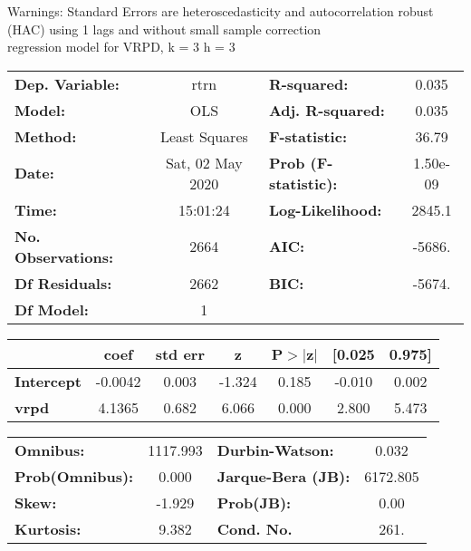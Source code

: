 Warnings: \newline
 [1] Standard Errors are heteroscedasticity and autocorrelation robust (HAC) using 1 lags and without small sample correction\\ 

regression model for VRPD, k = 3 h = 3\begin{center}
\begin{tabular}{lclc}
\toprule
\textbf{Dep. Variable:}    &       rtrn       & \textbf{  R-squared:         } &     0.035   \\
\textbf{Model:}            &       OLS        & \textbf{  Adj. R-squared:    } &     0.035   \\
\textbf{Method:}           &  Least Squares   & \textbf{  F-statistic:       } &     36.79   \\
\textbf{Date:}             & Sat, 02 May 2020 & \textbf{  Prob (F-statistic):} &  1.50e-09   \\
\textbf{Time:}             &     15:01:24     & \textbf{  Log-Likelihood:    } &    2845.1   \\
\textbf{No. Observations:} &        2664      & \textbf{  AIC:               } &    -5686.   \\
\textbf{Df Residuals:}     &        2662      & \textbf{  BIC:               } &    -5674.   \\
\textbf{Df Model:}         &           1      & \textbf{                     } &             \\
\bottomrule
\end{tabular}
\begin{tabular}{lcccccc}
                   & \textbf{coef} & \textbf{std err} & \textbf{z} & \textbf{P$> |$z$|$} & \textbf{[0.025} & \textbf{0.975]}  \\
\midrule
\textbf{Intercept} &      -0.0042  &        0.003     &    -1.324  &         0.185        &       -0.010    &        0.002     \\
\textbf{vrpd}      &       4.1365  &        0.682     &     6.066  &         0.000        &        2.800    &        5.473     \\
\bottomrule
\end{tabular}
\begin{tabular}{lclc}
\textbf{Omnibus:}       & 1117.993 & \textbf{  Durbin-Watson:     } &    0.032  \\
\textbf{Prob(Omnibus):} &   0.000  & \textbf{  Jarque-Bera (JB):  } & 6172.805  \\
\textbf{Skew:}          &  -1.929  & \textbf{  Prob(JB):          } &     0.00  \\
\textbf{Kurtosis:}      &   9.382  & \textbf{  Cond. No.          } &     261.  \\
\bottomrule
\end{tabular}
\end{center}

